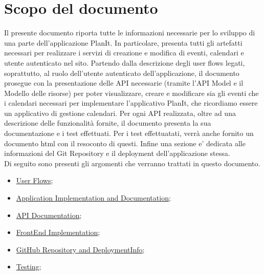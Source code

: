 \section*{Scopo del documento}


Il presente documento riporta tutte le informazioni necessarie per lo sviluppo di una parte dell'applicazione PlanIt. In particolare, presenta tutti gli artefatti necessari per realizzare i servizi di creazione e modifica di eventi, calendari e utente autenticato nel sito.
Partendo dalla descrizione degli user flows legati, soprattutto, al ruolo dell'utente autenticato dell'applicazione, il documento prosegue con la presentazione delle API necessarie (tramite l'API Model e il Modello delle risorse) per poter visualizzare, creare e modificare sia gli eventi che i calendari necessari per implementare l'applicativo PlanIt, che ricordiamo essere un applicativo di gestione calendari.
Per ogni API realizzata, oltre ad una descrizione delle funzionalità fornite, il documento presenta la sua documentazione e i test effettuati. Per i test effettuatati, verrà anche fornito un documento html con il resoconto di questi. Infine una sezione e' dedicata alle informazioni del Git Repository e il deployment dell'applicazione stessa. \\ Di seguito sono presenti gli argomenti che verranno trattati in questo documento.

\begin{itemize}
    \item \hyperref[secD4:UserFlows]{User Flows};
    \item \hyperref[secD4:ApplicationImplementationAndDocumentation]{Application Implementation and Documentation};
    \item \hyperref[secD4:APIDocumentation]{API Documentation};
    \item \hyperref[secD4:FrontEndImplementation]{FrontEnd Implementation};
    \item \hyperref[secD4:GitHubRepositoryAndDeploymentInfo]{GitHub Repository and DeploymentInfo};
    \item \hyperref[secD4:Testing]{Testing};
\end{itemize}

